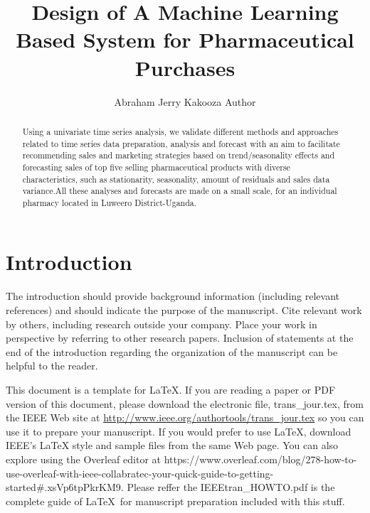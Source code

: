 \documentclass[]{IEEEibm}
\begin{document}
\title{Design of A Machine Learning Based System for Pharmaceutical Purchases}

\author{Abraham Jerry Kakooza Author }


\begin{abstract}
    Using a univariate time series analysis, we validate  different methods and approaches related to time series data preparation, analysis and forecast with an aim to facilitate recommending sales and marketing strategies based on trend/seasonality effects and forecasting sales of top five selling pharmaceutical products with diverse characteristics, such as stationarity, seasonality, amount of residuals and sales data variance.All  these  analyses  and forecasts are made on a small scale, for an individual pharmacy located in Luweero District-Uganda.
    
\end{abstract}

\maketitle


\section{Introduction}

The introduction should provide background information (including relevant references) and should indicate the purpose of the manuscript. Cite relevant work by others, including research outside your company. Place your work in perspective by referring to other research papers. Inclusion of statements at the end of the introduction regarding the organization of the manuscript can be helpful to the reader.


This document is a template for \LaTeX. If you are reading a paper or PDF version of this document, please download the electronic file, trans\_jour.tex, from the IEEE Web site at \url{http://www.ieee.org/authortools/trans_jour.tex} so you can use it to prepare your manuscript. If you would prefer to use LaTeX, download IEEE's LaTeX style and sample files from the same Web page. You can also explore using the Overleaf editor at {https://www.overleaf.com/blog/278-how-to-use-overleaf-with-ieee-collabratec-your-quick-guide-to-getting-started\#.xsVp6tpPkrKM9}. Please reffer the IEEEtran\_HOWTO.pdf is the complete guide of \LaTeX\ for manuscript preparation included with this stuff.
\end{document}
